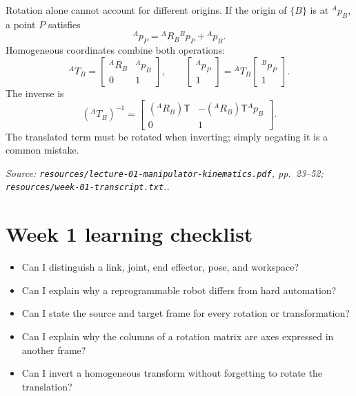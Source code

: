 \documentclass[11pt,a4paper]{article}
\renewcommand{\texttt}[1]{\nolinkurl{#1}}
\newcommand{\trans}{\mathsf{T}}
\newcommand{\source}[1]{\par\smallskip\noindent\textit{Source: #1.}\par\smallskip}
\begin{document}
Rotation alone cannot account for different origins. If the origin of $\{B\}$ is at ${}^{A}\!p_B$, a point $P$ satisfies
\[
 {}^{A}\!p_P={}^A\!R_B{}^B\!p_P+{}^A\!p_B.
\]
Homogeneous coordinates combine both operations:
\[
 {}^A\!T_B=\begin{bmatrix}{}^A\!R_B&{}^A\!p_B\\0&1\end{bmatrix},\qquad
 \begin{bmatrix}{}^A\!p_P\\1\end{bmatrix}={}^A\!T_B\begin{bmatrix}{}^B\!p_P\\1\end{bmatrix}.
\]
The inverse is
\[
 ({}^A\!T_B)^{-1}=\begin{bmatrix}({}^A\!R_B)\trans&-({}^A\!R_B)\trans{}^A\!p_B\\0&1\end{bmatrix}.
\]
The translated term must be rotated when inverting; simply negating it is a common mistake.
\source{\texttt{resources/lecture-01-manipulator-kinematics.pdf}, pp.~23--52; \texttt{resources/week-01-transcript.txt}.}

\section{\enspace Week 1 learning checklist}
\begin{itemize}
\item Can I distinguish a link, joint, end effector, pose, and workspace?
\item Can I explain why a reprogrammable robot differs from hard automation?
\item Can I state the source and target frame for every rotation or transformation?
\item Can I explain why the columns of a rotation matrix are axes expressed in another frame?
\item Can I invert a homogeneous transform without forgetting to rotate the translation?
\end{itemize}
\end{document}
